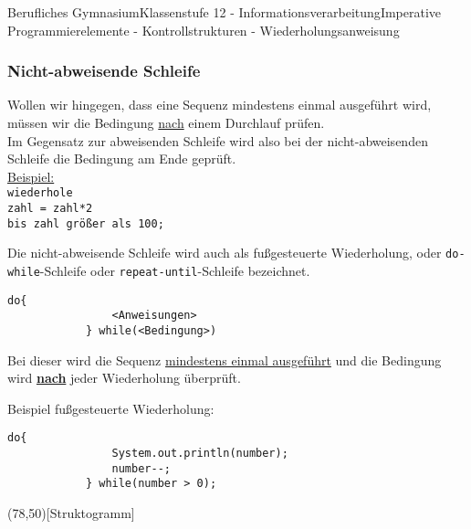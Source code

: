\documentclass[11pt,oneside,openany,headings=optiontotoc,11pt,numbers=noenddot]{article}
\begin{document}
\begin{worksheet}{Berufliches Gymnasium}{Klassenstufe 12 - Informationsverarbeitung}{Imperative Programmierelemente - Kontrollstrukturen - Wiederholungsanweisung}
		\subsubsection{Nicht-abweisende Schleife}
		Wollen wir hingegen, dass eine Sequenz mindestens einmal ausgeführt wird, müssen wir die Bedingung \underline{nach} einem Durchlauf prüfen.\\
		Im Gegensatz zur abweisenden Schleife wird also bei der nicht-abweisenden Schleife die Bedingung am Ende geprüft.\\
		\underline{Beispiel:}\\
		\texttt{\indent{}wiederhole\\
		\indent{}\indent{}zahl = zahl*2\\
		\indent\indent\indent{}bis zahl größer als 100;}\\
		\par\noindent
		Die nicht-abweisende Schleife wird auch als fußgesteuerte Wiederholung, oder \lstinline[style=JavaInputStyle]{do-while}-Schleife oder \lstinline[style=JavaInputStyle]{repeat-until}-Schleife bezeichnet.\\
		\begin{lstlisting}[style=JavaInputStyle]
			do{
				<Anweisungen>
			} while(<Bedingung>)
		\end{lstlisting}
		\par\noindent
		Bei dieser wird die Sequenz \underline{mindestens einmal ausgeführt} und die Bedingung wird \textbf{\underline{nach}} jeder Wiederholung überprüft.\\
		\par\noindent
		\begin{minipage}[t]{0.48\textwidth}
			\vspace*{0pt}
			Beispiel fußgesteuerte Wiederholung:
			\begin{lstlisting}[style=JavaInputStyle,frame=single]
			do{
				System.out.println(number);
				number--;
			} while(number > 0);
			\end{lstlisting}
		\end{minipage}
		\hfill
		\begin{minipage}[t]{0.48\textwidth}
			\vspace*{0pt}
			\begin{struktogramm}(78,50)[Struktogramm]
				\untilend
			\end{struktogramm}
		\end{minipage}
	\end{worksheet}
\end{document}
